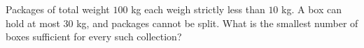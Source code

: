 Packages of total weight $100$ kg each weigh strictly less than $10$ kg. A box can hold at most $30$ kg, and packages cannot be split. What is the smallest number of boxes sufficient for every such collection?
